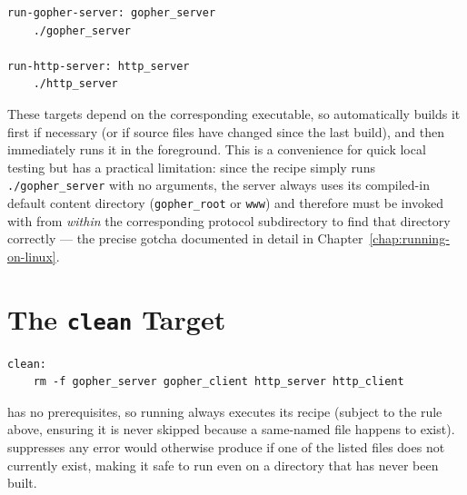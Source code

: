 \begin{lstlisting}[style=bashstyle, numbers=none]
run-gopher-server: gopher_server
	./gopher_server

run-http-server: http_server
	./http_server
\end{lstlisting}

These targets depend on the corresponding executable, so  automatically builds it first if necessary (or if source files have changed since the last build), and then immediately runs it in the foreground. This is a convenience for quick local testing but has a practical limitation: since the recipe simply runs \texttt{./gopher\_server} with no arguments, the server always uses its compiled-in default content directory (\texttt{gopher\_root} or \texttt{www}) and therefore must be invoked with  from \emph{within} the corresponding protocol subdirectory to find that directory correctly --- the precise gotcha documented in detail in Chapter~\ref{chap:running-on-linux}.

\section{The \texttt{clean} Target}

\begin{lstlisting}[style=bashstyle, numbers=none]
clean:
	rm -f gopher_server gopher_client http_server http_client
\end{lstlisting}

 has no prerequisites, so running  always executes its recipe (subject to the  rule above, ensuring it is never skipped because a same-named file happens to exist).  suppresses any error  would otherwise produce if one of the listed files does not currently exist, making it safe to run  even on a directory that has never been built.
